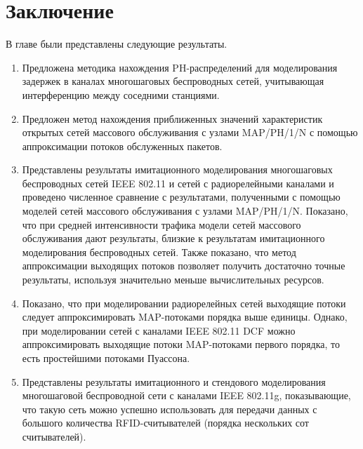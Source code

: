 \section{Заключение}\label{sec:ch4_conclusion}
В главе были представлены следующие результаты.

\begin{enumerate}
  \item Предложена методика нахождения PH-распределений для моделирования задержек в каналах многошаговых беспроводных сетей, учитывающая интерференцию между соседними станциями.
  \item Предложен метод нахождения приближенных значений характеристик открытых сетей массового обслуживания с узлами MAP/PH/1/N с помощью аппроксимации потоков обслуженных пакетов.
  \item Представлены результаты имитационного моделирования многошаговых беспроводных сетей IEEE 802.11 и сетей с радиорелейными каналами и проведено численное сравнение с результатами, полученными с помощью моделей сетей массового обслуживания с узлами MAP/PH/1/N. Показано, что при средней интенсивности трафика модели сетей массового обслуживания дают результаты, близкие к результатам имитационного моделирования беспроводных сетей. Также показано, что метод аппроксимации выходящих потоков позволяет получить достаточно точные результаты, используя значительно меньше вычислительных ресурсов.
  \item Показано, что при моделировании радиорелейных сетей выходящие потоки следует аппроксимировать MAP-потоками порядка выше единицы. Однако, при моделировании сетей с каналами IEEE 802.11 DCF можно аппроксимировать выходящие потоки MAP-потоками первого порядка, то есть простейшими потоками Пуассона.
  \item Представлены результаты имитационного и стендового моделирования многошаговой беспроводной сети с каналами IEEE 802.11g, показывающие, что такую сеть можно успешно использовать для передачи данных с большого количества RFID-считывателей (порядка нескольких сот считывателей).
\end{enumerate}


\clearpage
